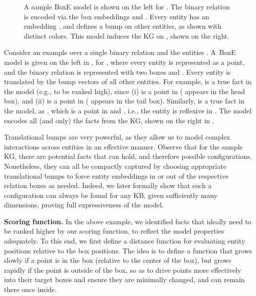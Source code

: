 \documentclass{article}
\begin{document}
\begin{figure}[t!]
\begin{subfigure}{0.4\linewidth}
	\end{subfigure}
	\caption{A sample BoxE model is shown on the left for . The binary relation   is encoded via the box embeddings  and . Every entity  has an embedding , and defines a bump on other entities, as shown with distinct colors. This model induces the KG on , shown on the right.}
	\label{fig:BoxEBumps}
\end{figure}
\begin{example}
{\rm 
Consider an example over a single binary relation  and the entities .
A~BoxE model is given on the left in  , for , where every entity is represented as a point, and the binary relation  is represented with two boxes  and .
Every entity is translated by the bump vectors of all other entities. For example,  is a true fact in the model (e.g., to be ranked high), since (i)   is a point in  ( appears in the head box), and (ii)  is a point in  ( appears in the tail box). Similarly,  is a true fact in the model, as  , which is a point in  and , i.e., the entity is reflexive in . The model encodes all (and only) the facts from the KG, shown on the right in . \hfill


}
\end{example}

Translational bumps are very powerful, as they allow us to model complex interactions across entities in an effective manner. Observe that for the sample KG, there are  potential facts that can hold, and therefore  possible configurations. Nonetheless, they can all be compactly captured by choosing appropriate translational bumps to force entity embeddings in or out of the respective relation boxes as needed. Indeed, we later formally show that such a configuration can always be found for any KB, given sufficiently many dimensions, proving full expressiveness of the model.

\textbf{Scoring function.} 
In the above example, we identified facts that ideally need to be ranked higher by our scoring function,  to reflect the model properties adequately.
To this end, we first define a distance function for evaluating entity positions relative to the box positions.
The idea is to define a function that grows slowly if a point is in the box (relative to the center of the box), but grows rapidly if the point is outside of the box, so as to drive points more effectively into their target boxes and ensure they are minimally changed, and can remain there once inside. 
\end{document}

